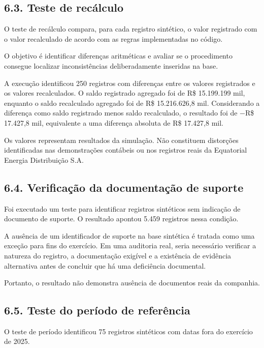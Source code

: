 \documentclass[
]{article}
\begin{document}
\subsection{6.3. Teste de recálculo}\label{teste-de-recuxe1lculo}

O teste de recálculo compara, para cada registro sintético, o valor
registrado com o valor recalculado de acordo com as regras implementadas
no código.

O objetivo é identificar diferenças aritméticas e avaliar se o
procedimento consegue localizar inconsistências deliberadamente
inseridas na base.

A execução identificou 250 registros com diferenças entre os valores
registrados e os valores recalculados. O saldo registrado agregado foi
de R\$ 15.199.199 mil, enquanto o saldo recalculado agregado foi de R\$
15.216.626,8 mil. Considerando a diferença como saldo registrado menos
saldo recalculado, o resultado foi de −R\$ 17.427,8 mil, equivalente a
uma diferença absoluta de R\$ 17.427,8 mil.

Os valores representam resultados da simulação. Não constituem
distorções identificadas nas demonstrações contábeis ou nos registros
reais da Equatorial Energia Distribuição S.A.

\subsection{6.4. Verificação da documentação de
suporte}\label{verificauxe7uxe3o-da-documentauxe7uxe3o-de-suporte}

Foi executado um teste para identificar registros sintéticos sem
indicação de documento de suporte. O resultado apontou 5.459 registros
nessa condição.

A ausência de um identificador de suporte na base sintética é tratada
como uma exceção para fins do exercício. Em uma auditoria real, seria
necessário verificar a natureza do registro, a documentação exigível e a
existência de evidência alternativa antes de concluir que há uma
deficiência documental.

Portanto, o resultado não demonstra ausência de documentos reais da
companhia.

\subsection{6.5. Teste do período de
referência}\label{teste-do-peruxedodo-de-referuxeancia}

O teste de período identificou 75 registros sintéticos com datas fora do
exercício de 2025.
\end{document}
